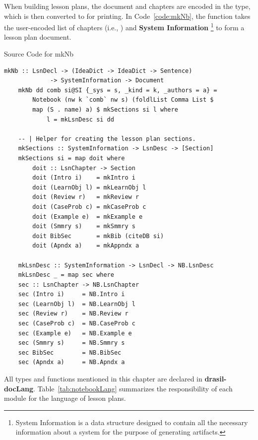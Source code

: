 When building lesson plans, the document and chapters are encoded in the 
 type, which is then converted to  for 
printing. In Code~\ref{code:mkNb}, the  function takes the 
user-encoded list of chapters (i.e., ) and \textbf{System 
Information} \footnote{System Information is a data structure designed to 
contain all the necessary information about a system for the purpose of 
generating artifacts.} to form a lesson plan document.

\begin{listing}[h!]
	\caption{Source Code for mkNb}
	\label{code:mkNb}
	\begin{lstlisting}[language=haskell1]
	mkNb :: LsnDecl -> (IdeaDict -> IdeaDict -> Sentence) 
			 -> SystemInformation -> Document
	mkNb dd comb si@SI {_sys = s, _kind = k, _authors = a} =
		Notebook (nw k `comb` nw s) (foldlList Comma List $ 
		map (S . name) a) $	mkSections si l where
			l = mkLsnDesc si dd
	
	-- | Helper for creating the lesson plan sections.
	mkSections :: SystemInformation -> LsnDesc -> [Section]
	mkSections si = map doit where
		doit :: LsnChapter -> Section
		doit (Intro i)    = mkIntro i
		doit (LearnObj l) = mkLearnObj l
		doit (Review r)   = mkReview r
		doit (CaseProb c) = mkCaseProb c
		doit (Example e)  = mkExample e
		doit (Smmry s)    = mkSmmry s
		doit BibSec       = mkBib (citeDB si)
		doit (Apndx a)    = mkAppndx a
	
	mkLsnDesc :: SystemInformation -> LsnDecl -> NB.LsnDesc
	mkLsnDesc _ = map sec where
	sec :: LsnChapter -> NB.LsnChapter
	sec (Intro i)     = NB.Intro i
	sec (LearnObj l)  = NB.LearnObj l
	sec (Review r)    = NB.Review r  
	sec (CaseProb c)  = NB.CaseProb c
	sec (Example e)   = NB.Example e  
	sec (Smmry s)     = NB.Smmry s
	sec BibSec        = NB.BibSec
	sec (Apndx a)     = NB.Apndx a
	\end{lstlisting}
\end{listing}

All types and functions mentioned in this chapter are declared in 
\textbf{drasil-docLang}. Table~\ref{tab:notebookLang} summarizes the 
responsibility of each module for the language of lesson plans.

